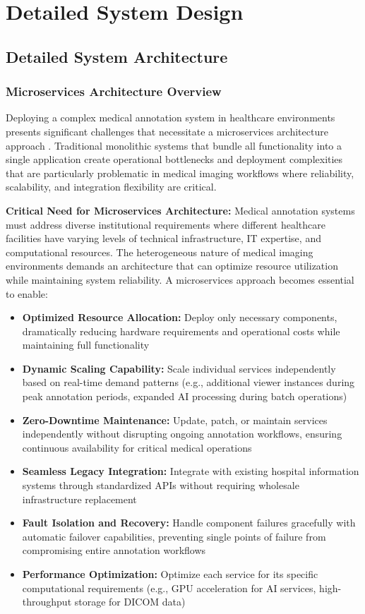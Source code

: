 \chapter{Detailed System Design}

\section{Detailed System Architecture}

\subsection{Microservices Architecture Overview}

Deploying a complex medical annotation system in healthcare environments presents significant challenges that necessitate a microservices architecture approach \cite{newman2015building}. Traditional monolithic systems that bundle all functionality into a single application create operational bottlenecks and deployment complexities that are particularly problematic in medical imaging workflows where reliability, scalability, and integration flexibility are critical.

\textbf{Critical Need for Microservices Architecture:} Medical annotation systems must address diverse institutional requirements where different healthcare facilities have varying levels of technical infrastructure, IT expertise, and computational resources. The heterogeneous nature of medical imaging environments demands an architecture that can optimize resource utilization while maintaining system reliability. A microservices approach becomes essential to enable:

\begin{itemize}
    \item \textbf{Optimized Resource Allocation:} Deploy only necessary components, dramatically reducing hardware requirements and operational costs while maintaining full functionality
    \item \textbf{Dynamic Scaling Capability:} Scale individual services independently based on real-time demand patterns (e.g., additional viewer instances during peak annotation periods, expanded AI processing during batch operations)
    \item \textbf{Zero-Downtime Maintenance:} Update, patch, or maintain services independently without disrupting ongoing annotation workflows, ensuring continuous availability for critical medical operations
    \item \textbf{Seamless Legacy Integration:} Integrate with existing hospital information systems through standardized APIs without requiring wholesale infrastructure replacement
    \item \textbf{Fault Isolation and Recovery:} Handle component failures gracefully with automatic failover capabilities, preventing single points of failure from compromising entire annotation workflows
    \item \textbf{Performance Optimization:} Optimize each service for its specific computational requirements (e.g., GPU acceleration for AI services, high-throughput storage for DICOM data)
\end{itemize}


